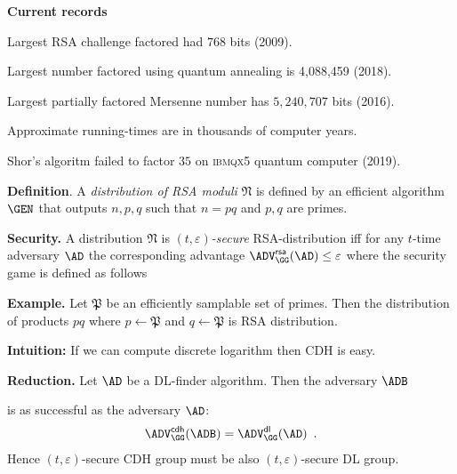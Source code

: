 \documentclass[landscape,footrule]{foils}
\newcommand{\lastline}{\vspace*{-2ex}}
\begin{document}
\textbf{Current records}
\begin{triangles}
  \item Largest RSA challenge factored had $768$ bits (2009).
  \item Largest number factored using quantum annealing is 4,088,459 (2018). 
  \item Largest partially factored Mersenne number has $5,240,707$ bits (2016).
  \item Approximate running-times are in thousands of computer years.
  \item Shor's algoritm failed to factor $35$ on \textsc{ibmqx5} quantum computer (2019).
\end{triangles}\vspace*{-5ex}


\textbf{Definition}. A \emph{distribution of RSA moduli} $\mathfrak{N}$ is
defined by an efficient algorithm $\GEN$ that outputs $n,p,q$ such
that $n=pq$ and $p,q$ are primes.
\bigskip

\textbf{Security.} A distribution $\mathfrak{N}$ is
\emph{$(t,\varepsilon)$-secure} RSA-distribution iff for any $t$-time
adversary $\AD$ the corresponding advantage
$\advRSAXX{\GG}{\AD}\leq\varepsilon$ where the security game is
defined as follows
 

\textbf{Example.}  Let $\mathfrak{P}$ be an efficiently samplable set
of primes. Then the distribution of products $pq$ where
$p\gets\mathfrak{P}$ and $q\gets\mathfrak{P}$ is RSA distribution. 
\lastline





\textbf{Intuition:} If we can compute discrete logarithm then CDH is easy.


\textbf{Reduction.} Let $\AD$ be a DL-finder algorithm. Then the adversary $\ADB$


is as successful as the adversary $\AD$:
\begin{align*}
  \advCDHXX{\GG}{\ADB}=\advDLXX{\GG}{\AD}\enspace.
\end{align*}
Hence $(t,\varepsilon)$-secure CDH group must be also $(t,\varepsilon)$-secure DL group.
\lastline
\end{document}
